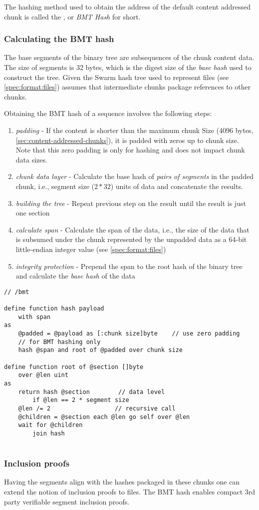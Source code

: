 The hashing method used to obtain the address of the default content addressed chunk is called the , or \emph{BMT Hash} for short. 

\subsubsection{Calculating the BMT hash}

The base segments of the binary tree are subsequences of the chunk content data. 
The size of segments is 32  bytes, which is the digest size of the \emph{base hash} used to construct the tree. 
Given the Swarm hash tree used to represent files (see \ref{spec:format:files}) assumes that intermediate chunks package references to other chunks. 

Obtaining the BMT hash of a sequence involves the following steps:

\begin{enumerate}
\item \emph{padding} - If the content is shorter than the maximum chunk Size  (4096 bytes, \ref{sec:content-addressed-chunks}), it is padded with zeros up to chunk size. Note that this zero padding is only for hashing and does not impact chunk data sizes.
\item \emph{chunk data layer} - Calculate the base hash of \emph{pairs of segments} in the padded chunk, i.e., segment size ($2 * 32$) units of data and concatenate the results.
\item \emph{building the tree} - Repeat previous step on the result until the result is just one section
\item \emph{calculate span} - Calculate the span of the data, i.e., the size of the data that is subsumed under the chunk represented by the unpadded data as a 64-bit little-endian integer value (see  \ref{spec:format:files})            
\item \emph{integrity protection} - Prepend the span to the root hash of the binary tree and calculate the \emph{base hash} of the data
\end{enumerate}

\begin{definition}\label{def:bmt-hash}
\begin{lstlisting}[language=buzz1]
// /bmt

define function hash payload 
    with span
as
    @padded = @payload as [:chunk size]byte    // use zero padding 
    // for BMT hashing only
    hash @span and root of @padded over chunk size 
    
define function root of @section []byte
    over @len uint
as
    return hash @section        // data level
        if @len == 2 * segment size
    @len /= 2                  // recursive call
    @children = @section each @len go self over @len
    wait for @children 
        join hash
    

\end{lstlisting}
\end{definition}

\subsubsection{Inclusion proofs}

Having the segments align with the hashes packaged in these chunks one can extend the notion of inclusion proofs to files.
The BMT hash enables compact 3rd party verifiable segment inclusion proofs.

